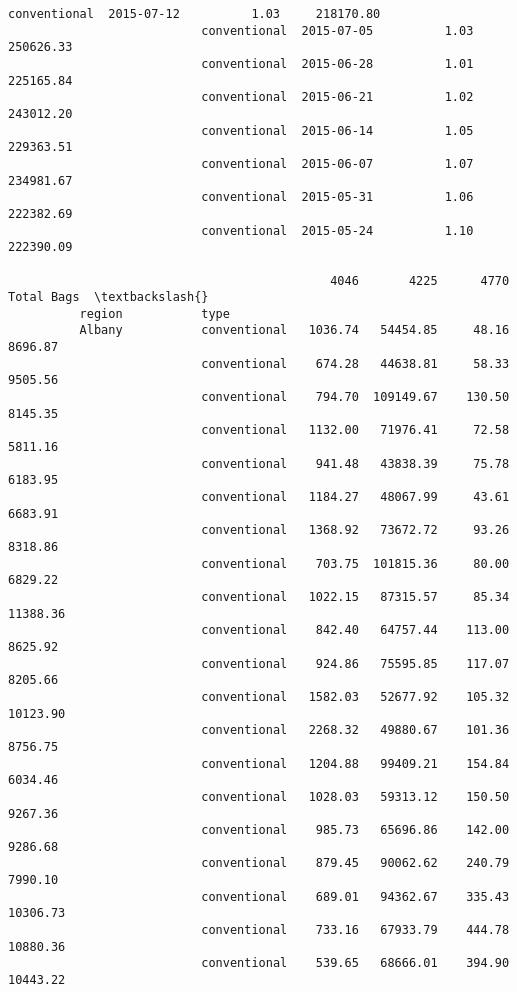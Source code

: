 \documentclass[11pt]{article}
\begin{document}
\begin{Verbatim}[commandchars=\\\{\}]
                           conventional  2015-07-12          1.03     218170.80   
                           conventional  2015-07-05          1.03     250626.33   
                           conventional  2015-06-28          1.01     225165.84   
                           conventional  2015-06-21          1.02     243012.20   
                           conventional  2015-06-14          1.05     229363.51   
                           conventional  2015-06-07          1.07     234981.67   
                           conventional  2015-05-31          1.06     222382.69   
                           conventional  2015-05-24          1.10     222390.09   
          
                                             4046       4225      4770  Total Bags  \textbackslash{}
          region           type                                                      
          Albany           conventional   1036.74   54454.85     48.16     8696.87   
                           conventional    674.28   44638.81     58.33     9505.56   
                           conventional    794.70  109149.67    130.50     8145.35   
                           conventional   1132.00   71976.41     72.58     5811.16   
                           conventional    941.48   43838.39     75.78     6183.95   
                           conventional   1184.27   48067.99     43.61     6683.91   
                           conventional   1368.92   73672.72     93.26     8318.86   
                           conventional    703.75  101815.36     80.00     6829.22   
                           conventional   1022.15   87315.57     85.34    11388.36   
                           conventional    842.40   64757.44    113.00     8625.92   
                           conventional    924.86   75595.85    117.07     8205.66   
                           conventional   1582.03   52677.92    105.32    10123.90   
                           conventional   2268.32   49880.67    101.36     8756.75   
                           conventional   1204.88   99409.21    154.84     6034.46   
                           conventional   1028.03   59313.12    150.50     9267.36   
                           conventional    985.73   65696.86    142.00     9286.68   
                           conventional    879.45   90062.62    240.79     7990.10   
                           conventional    689.01   94362.67    335.43    10306.73   
                           conventional    733.16   67933.79    444.78    10880.36   
                           conventional    539.65   68666.01    394.90    10443.22   

\end{Verbatim}
\end{document}
